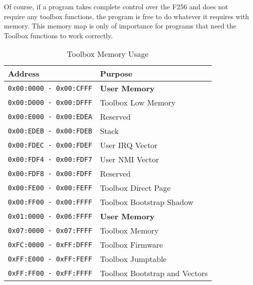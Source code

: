 Of course, if a program takes complete control over the F256 and does not require any toolbox functions, the program is free
to do whatever it requires with memory. This memory map is only of importance for programs that need the Toolbox functions to
work correctly.

\begin{table}
	\begin{center}
		\begin{tabular}{|l|l|} \hline
			Address & Purpose \\ \hline\hline
			{\tt 0x00:0000 - 0x00:CFFF} & {\bf User Memory} \\ \hline
			{\tt 0x00:D000 - 0x00:DFFF} & Toolbox Low Memory \\ \hline
			{\tt 0x00:E000 - 0x00:EDEA} & Reserved \\ \hline
			{\tt 0x00:EDEB - 0x00:FDEB} & Stack \\ \hline
			{\tt 0x00:FDEC - 0x00:FDEF} & User IRQ Vector \\ \hline
			{\tt 0x00:FDF4 - 0x00:FDF7} & User NMI Vector \\ \hline
			{\tt 0x00:FDF8 - 0x00:FDFF} & Reserved \\ \hline
			{\tt 0x00:FE00 - 0x00:FEFF} & Toolbox Direct Page \\ \hline
			{\tt 0x00:FF00 - 0x00:FFFF} & Toolbox Bootstrap Shadow \\ \hline
			{\tt 0x01:0000 - 0x06:FFFF} & {\bf User Memory} \\ \hline	
			{\tt 0x07:0000 - 0x07:FFFF} & Toolbox Memory \\ \hline
			{\tt 0xFC:0000 - 0xFF:DFFF} & Toolbox Firmware \\ \hline
			{\tt 0xFF:E000 - 0xFF:FEFF} & Toolbox Jumptable \\ \hline
			{\tt 0xFF:FF00 - 0xFF:FFFF} & Toolbox Bootstrap and Vectors \\ \hline
		\end{tabular}
	\end{center}
	\caption{Toolbox Memory Usage}
	\label{tbl:memory_map}
\end{table}